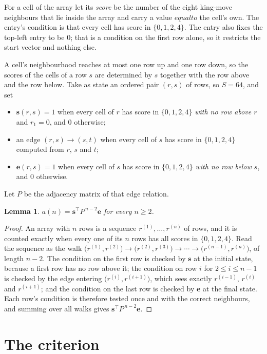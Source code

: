 \documentclass[11pt,a4paper]{article}
\theoremstyle{plain}
\newtheorem{lemma}[theorem]{Lemma}
\theoremstyle{definition}
\begin{document}
For a cell of the array let its \emph{score} be the number of the eight king-move neighbours that lie inside
the array and carry a value $equal to$ the cell's own. The entry's condition is that every cell
has score in $\{0,1,2,4\}$. The entry also fixes the top-left entry to be $0$; that is a condition on the first row alone, so it restricts the start vector and nothing else.

A cell's neighbourhood reaches at most one row up and one row down, so the scores of the
cells of a row $s$ are determined by $s$ together with the row above and the row below.
Take as state an ordered pair $(r,s)$ of rows, so $S=64$, and set
\begin{itemize}
\item $\mathbf{s}(r,s)=1$ when every cell of $r$ has score in $\{0,1,2,4\}$ \emph{with no row
above $r$} and $r_1=0$, and $0$ otherwise;
\item an edge $(r,s)\to(s,t)$ when every cell of $s$ has score in $\{0,1,2,4\}$ computed from
$r$, $s$ and $t$;
\item $\mathbf{e}(r,s)=1$ when every cell of $s$ has score in $\{0,1,2,4\}$ \emph{with no row
below $s$}, and $0$ otherwise.
\end{itemize}
Let $P$ be the adjacency matrix of that edge relation.

\begin{lemma}\label{lem:walk}
$a(n)=\mathbf{s}^{\!\top}P^{\,n-2}\mathbf{e}$ for every $n\ge2$.
\end{lemma}

\begin{proof}
An array with $n$ rows is a sequence $r^{(1)},\dots,r^{(n)}$ of rows, and it is counted
exactly when every one of its $n$ rows has all scores in $\{0,1,2,4\}$. Read the sequence as the
walk $\bigl(r^{(1)},r^{(2)}\bigr)\to\bigl(r^{(2)},r^{(3)}\bigr)\to\cdots\to
\bigl(r^{(n-1)},r^{(n)}\bigr)$, of length $n-2$. The condition on the first row is
checked by $\mathbf{s}$ at the initial state, because a first row has no row above it; the
condition on row $i$ for $2\le i\le n-1$ is checked by the edge entering
$\bigl(r^{(i)},r^{(i+1)}\bigr)$, which sees exactly $r^{(i-1)}$, $r^{(i)}$ and
$r^{(i+1)}$; and the condition on the last row is checked by $\mathbf{e}$ at the final
state. Each row's condition is therefore tested once and with the correct neighbours, and
summing over all walks gives $\mathbf{s}^{\!\top}P^{\,n-2}\mathbf{e}$.
\end{proof}

\section{The criterion}
\end{document}
